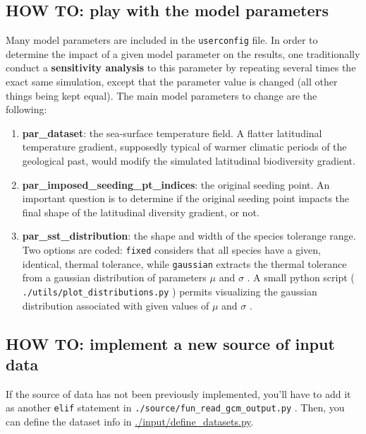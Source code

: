 \documentclass[a4paper, 11pt]{article}
\newcommand\code[1]{%
\texttt{#1}%
}
\begin{document}
    \subsection{HOW TO: play with the model parameters}

Many model parameters are included in the \code{userconfig} file. In order to determine the impact of a given model parameter on the results, one traditionally conduct a \textbf{sensitivity analysis} to this parameter by repeating several times the exact same simulation, except that the parameter value is changed (all other things being kept equal). The main model parameters to change are the following:
\begin{enumerate}
    \item \textbf{par\_dataset}: the sea-surface temperature field. A flatter latitudinal temperature gradient, supposedly typical of warmer climatic periods of the geological past, would modify the simulated latitudinal biodiversity gradient.
    \item \textbf{par\_imposed\_seeding\_pt\_indices}: the original seeding point. An important question is to determine if the original seeding point impacts the final shape of the latitudinal diversity gradient, or not.
    \item \textbf{par\_sst\_distribution}: the shape and width of the species tolerange range. Two options are coded: \code{fixed} considers that all species have a given, identical, thermal tolerance, while \code{gaussian} extracts the thermal tolerance from a gaussian distribution of parameters \code{$\mu$} and \code{$\sigma$}. A small python script (\code{./utils/plot\_distributions.py}) permits visualizing the gaussian distribution associated with given values of \code{$\mu$} and \code{$\sigma$}. 
\end{enumerate}

    \subsection{HOW TO: implement a new source of input data}

If the source of data has not been previously implemented, you'll have to add it as another \code{elif} statement in \code{./source/fun\_read\_gcm\_output.py}.
Then, you can define the dataset info in \url{./input/define\_datasets.py}.


 
\end{document}
